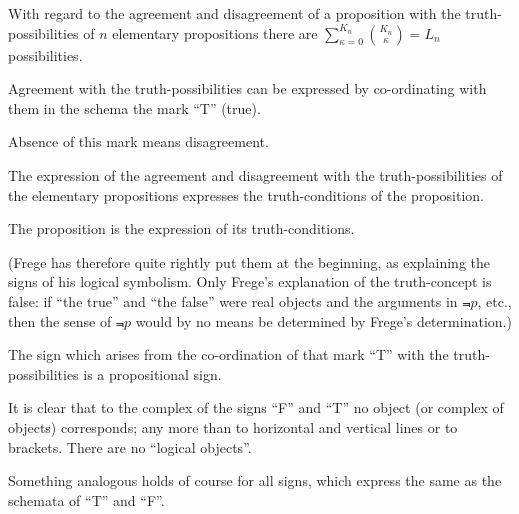 {With regard to the agreement and disagreement
of a proposition with the truth-possibilities
of $n$ elementary propositions there
are $\sum\limits_{\kappa = 0}^{K_n}\binom{K_n}{\kappa} = L_{n}$ possibilities.}


{Agreement with the truth-possibilities can be
expressed by co-or\-di\-na\-ting with them in the
schema the mark ``T'' (true).

Absence of this mark means disagreement.}


{The expression of the agreement and disagreement
with the truth-pos\-si\-bil\-i\-ties of the elementary
propositions expresses the truth-conditions of the
proposition.

The proposition is the expression of its truth-conditions.

(Frege has therefore quite rightly put them at
the beginning, as explaining the signs of his
logical symbolism. Only Frege's explanation
of the truth-concept is false: if ``the true'' and
``the false'' were real objects and the arguments
in $\Not{p}$, etc., then the sense of $\Not{p}$ would by no
means be determined by Frege's determination.)}


{The sign which arises from the co-ordination of
that mark ``T'' with the truth-pos\-si\-bil\-i\-ties is a
propositional sign.}


{It is clear that to the complex of the signs ``F''
and ``T'' no object (or complex of objects) corresponds;
any more than to horizontal and vertical
lines or to brackets. There are no ``logical
objects''.

Something analogous holds of course for all
signs, which express the same as the schemata of
``T'' and ``F''.}


